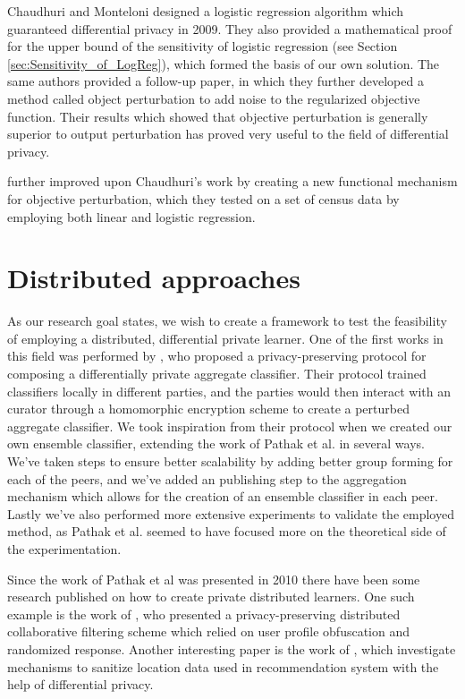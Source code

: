 
Chaudhuri and Monteloni designed a logistic regression algorithm which guaranteed differential privacy in 2009. They also provided a mathematical proof for the upper bound of the sensitivity of logistic regression (see Section \ref{sec:Sensitivity_of_LogReg}), which formed the basis of our own solution. The same authors provided a follow-up paper\citep{chaudhuri2011riskMinimization}, in which they further developed a method called object perturbation to add noise to the regularized objective function. Their results which showed that objective perturbation is generally superior to output perturbation has proved very useful to the field of differential privacy. 

\cite{zhang2012functionMechanism} further improved upon Chaudhuri's work by creating a new functional mechanism for objective perturbation, which they tested on a set of census data by employing both linear and logistic regression. 

\section{Distributed approaches}
As our research goal states, we wish to create a framework to test the feasibility of employing a distributed, differential private learner. One of the first works in this field was performed by  \cite{pathak2010diffprivhomo}, who proposed a privacy-preserving protocol for composing a differentially private aggregate classifier. Their protocol trained classifiers locally in different parties, and the parties would then interact with an curator through a homomorphic encryption scheme to create a perturbed aggregate classifier. We took inspiration from their protocol when we created our own ensemble classifier, extending the work of Pathak et al. in several ways. We've taken steps to ensure better scalability by adding better group forming for each of the peers, and we've added an publishing step to the aggregation mechanism which allows for the creation of an ensemble classifier in each peer. Lastly we've also performed more extensive experiments to validate the employed method, as Pathak et al. seemed to have focused more on the theoretical side of the experimentation. 

Since the work of Pathak et al was presented in 2010 there have been some research published on how to create private distributed learners. One such example is the work of \cite{boutet2013DisCollFil}, who presented a privacy-preserving distributed collaborative filtering scheme which relied on user profile obfuscation and randomized response. Another interesting paper is the work of \cite{zhang2014locationRecommendation}, which investigate mechanisms to sanitize location data used in recommendation system with the help of differential privacy. 


